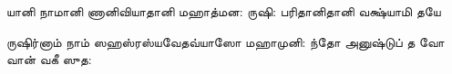 \documentclass[10pt]{article}
\begin{document}
{\newpage
\SlokaLarge
{யானி நாமானி ணானி}{வியாதானி மஹாத்மன:}
{ருஷி: பரிதானி}{தானி வக்ஷ்யாமி தயே}

\SlokaLarge
{ருஷிர்‌னாம்‌ நாம் ஸஹஸ்ரஸ்ய}{வேதவ்யாஸோ மஹாமுனி:}
{ந்தோ \dash அனுஷ்டுப்‌ த வோ} {வான்‌ வகீ ஸுத:}










}
\end{document}
